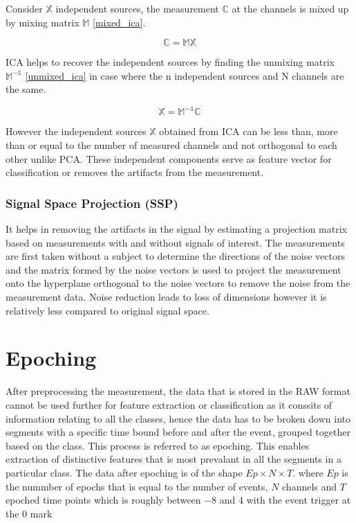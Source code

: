 Consider $\mathbb{X}$ independent sources, the measurement $\mathbb{C}$ at the channels is mixed up by mixing matrix $\mathbb{M}$ \ref{mixed_ica}.

\begin{equation} \label{eq:mixed_ica}
    \mathbb{C} = \mathbb{MX} 
\end{equation}

ICA helps to recover the independent sources by finding the unmixing matrix  $\mathbb{M^{-1}}$ \ref{unmixed_ica} in case where the n independent sources and 
N channels are the same.

\begin{equation} \label{eq:unmixed_ica}
    \mathbb{X} = \mathbb{M^{-1}C}
\end{equation}

However the independent sources $\mathbb{X}$ obtained from ICA can be less than, more than or equal to the number of measured channels and not orthogonal to each other unlike PCA. These independent
components serve as feature vector for classification or removes the artifacts from the measurement.

\subsubsection{Signal Space Projection (SSP)}
It helps in removing the artifacts in the signal by estimating a projection matrix based on measurements with and without signals of interest. The measurements are first taken without a subject to
determine the directions of the noise vectors and the matrix formed by the noise vectors is used to project the measurement onto the hyperplane orthogonal to the noise vectors to remove the noise 
from the measurement data. Noise reduction leads to loss of dimensions however it is relatively less compared to original signal space.  

\section{Epoching}
After preprocessing the measurement, the data that is stored in the RAW format cannot be used further for feature extraction or classification as it conssits of information
relating to all the classes, hence the data has to be broken down into segments with a specific time bound before and after the event, grouped together based on the class. This
process is referred to as epoching. This enables extraction of distinctive features that is most prevalant in all the segments in a particular class. The data after epoching is
of the shape $Ep \times N \times T$. where  $Ep$ is the nummber of epochs that is equal to the number of events, $N$ channels and $T$ epoched time points which is roughly between
$-8$ and $4$ with the event trigger at the $0$ mark

